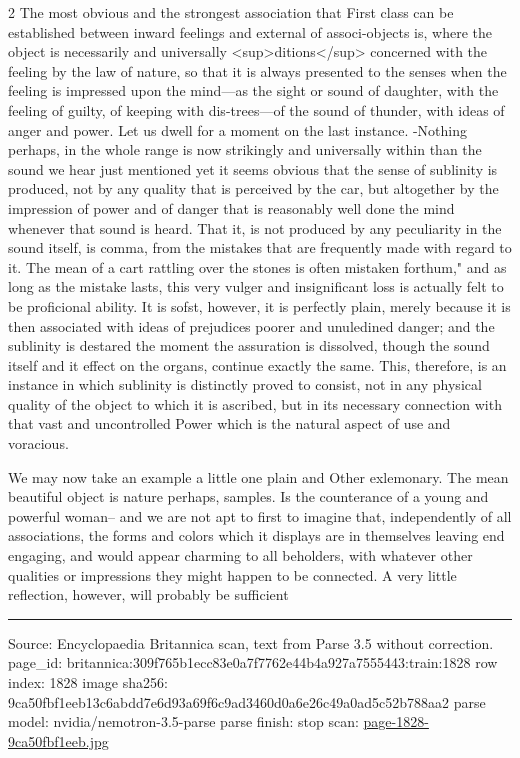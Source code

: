 \documentclass[10pt]{article}
\begin{document}
\begin{multicols}{2}
The most obvious and the strongest association that First class can be established between inward feelings and external of associ-objects is, where the object is necessarily and universally \textless{}sup\textgreater{}ditions\textless{}/sup\textgreater{} concerned with the feeling by the law of nature, so that it is always presented to the senses when the feeling is impressed upon the mind—as the sight or sound of daughter, with the feeling of guilty, of keeping with dis-trees—of the sound of thunder, with ideas of anger and power. Let us dwell for a moment on the last instance. -Nothing perhaps, in the whole range is now strikingly and universally within than the sound we hear just mentioned yet it seems obvious that the sense of sublinity is produced, not by any quality that is perceived by the car, but altogether by the impression of power and of danger that is reasonably well done the mind whenever that sound is heard. That it, is not produced by any peculiarity in the sound itself, is comma, from the mistakes that are frequently made with regard to it. The mean of a cart rattling over the stones is often mistaken forthum," and as long as the mistake lasts, this very vulger and insignificant loss is actually felt to be proficional ability. It is sofst, however, it is perfectly plain, merely because it is then associated with ideas of prejudices poorer and unuledined danger; and the sublinity is destared the moment the assuration is dissolved, though the sound itself and it effect on the organs, continue exactly the same. This, therefore, is an instance in which sublinity is distinctly proved to consist, not in any physical quality of the object to which it is ascribed, but in its necessary connection with that vast and uncontrolled Power which is the natural aspect of use and voracious.

We may now take an example a little one plain and Other exlemonary. The mean beautiful object is nature perhaps, samples. Is the counterance of a young and powerful woman-- and we are not apt to first to imagine that, independently of all associations, the forms and colors which it displays are in themselves leaving end engaging, and would appear charming to all beholders, with whatever other qualities or impressions they might happen to be connected. A very little reflection, however, will probably be sufficient

\end{multicols}
\vfill\par\noindent\rule{\linewidth}{0.4pt}\par
{\scriptsize\color{gray}\noindent Source: Encyclopaedia Britannica scan, text from Parse 3.5 without correction. page\_id: britannica:309f765b1ecc83e0a7f7762e44b4a927a7555443:train:1828 \quad row index: 1828 \quad image sha256: 9ca50fbf1eeb13c6abdd7e6d93a69f6c9ad3460d0a6e26c49a0ad5c52b788aa2 \quad parse model: nvidia/nemotron-3.5-parse \quad parse finish: stop \quad scan: \href{../scans/page-1828-9ca50fbf1eeb.jpg}{page-1828-9ca50fbf1eeb.jpg}\par}
\end{document}
